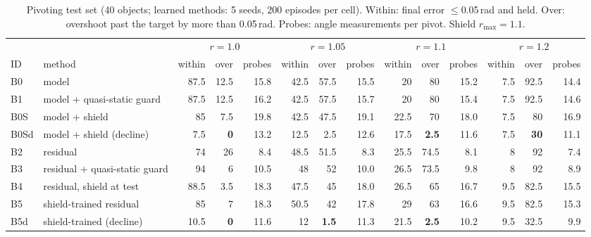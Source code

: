 \begin{table}[t]\centering\footnotesize
\caption{Pivoting test set (40 objects; learned methods: 5 seeds, 200 episodes per cell). Within: final error $\le$0.05\,rad and held. Over: overshoot past the target by more than 0.05\,rad. Probes: angle measurements per pivot. Shield $r_{\max}=1.1$.}\label{tab:pivot}
\setlength{\tabcolsep}{3.2pt}
\begin{tabular}{llrrrrrrrrrrrr}
\toprule
 & & \multicolumn{3}{c}{$r=1.0$} & \multicolumn{3}{c}{$r=1.05$} & \multicolumn{3}{c}{$r=1.1$} & \multicolumn{3}{c}{$r=1.2$}\\
\cmidrule(lr){3-5}\cmidrule(lr){6-8}\cmidrule(lr){9-11}\cmidrule(lr){12-14}
ID & method & within & over & probes & within & over & probes & within & over & probes & within & over & probes\\
\midrule
B0 & model & 87.5 & 12.5 & 15.8 & 42.5 & 57.5 & 15.5 & 20 & 80 & 15.2 & 7.5 & 92.5 & 14.4\\
B1 & model + quasi-static guard & 87.5 & 12.5 & 16.2 & 42.5 & 57.5 & 15.7 & 20 & 80 & 15.4 & 7.5 & 92.5 & 14.6\\
B0S & model + shield & 85 & 7.5 & 19.8 & 42.5 & 47.5 & 19.1 & 22.5 & 70 & 18.0 & 7.5 & 80 & 16.9\\
B0Sd & model + shield (decline) & 7.5 & \textbf{0} & 13.2 & 12.5 & 2.5 & 12.6 & 17.5 & \textbf{2.5} & 11.6 & 7.5 & \textbf{30} & 11.1\\
\midrule
B2 & residual & 74 & 26 & 8.4 & 48.5 & 51.5 & 8.3 & 25.5 & 74.5 & 8.1 & 8 & 92 & 7.4\\
B3 & residual + quasi-static guard & 94 & 6 & 10.5 & 48 & 52 & 10.0 & 26.5 & 73.5 & 9.8 & 8 & 92 & 8.9\\
B4 & residual, shield at test & 88.5 & 3.5 & 18.3 & 47.5 & 45 & 18.0 & 26.5 & 65 & 16.7 & 9.5 & 82.5 & 15.5\\
B5 & shield-trained residual & 85 & 7 & 18.3 & 50.5 & 42 & 17.8 & 29 & 63 & 16.6 & 9.5 & 82.5 & 15.3\\
B5d & shield-trained (decline) & 10.5 & \textbf{0} & 11.6 & 12 & \textbf{1.5} & 11.3 & 21.5 & \textbf{2.5} & 10.2 & 9.5 & 32.5 & 9.9\\
\bottomrule
\end{tabular}
\end{table}
